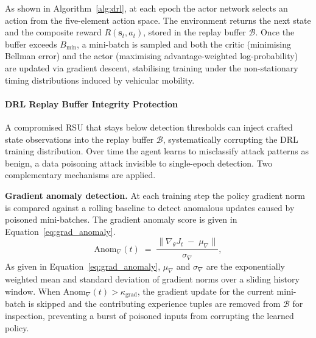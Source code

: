 As shown in Algorithm~\ref{alg:drl}, at each epoch the
actor network selects an action from the five-element
action space. The environment returns the next state and
the composite reward $R(\mathbf{s}_t, a_t)$, stored in
the replay buffer $\mathcal{B}$. Once the buffer exceeds
$B_{\min}$, a mini-batch is sampled and both the critic
(minimising Bellman error) and the actor (maximising
advantage-weighted log-probability) are updated via
gradient descent, stabilising training under the
non-stationary timing distributions induced by vehicular
mobility.



\paragraph{DRL Replay Buffer Integrity Protection}
\label{sec:drl_integrity}

A compromised RSU that stays below detection thresholds can inject
crafted state observations into the replay buffer $\mathcal{B}$,
systematically corrupting the DRL training distribution. Over time
the agent learns to misclassify attack patterns as benign, a data
poisoning attack invisible to single-epoch detection. Two
complementary mechanisms are applied.

\textbf{Gradient anomaly detection.}
At each training step the policy gradient norm is compared against
a rolling baseline to detect anomalous updates caused by poisoned
mini-batches. The gradient anomaly score is given in
Equation~\eqref{eq:grad_anomaly}.
%
\begin{equation}
  \mathrm{Anom}_{\nabla}(t) \;=\;
    \frac{
      \bigl\|\nabla_\theta J_t \;-\; \mu_{\nabla}\bigr\|
    }{
      \sigma_{\nabla}
    },
  \label{eq:grad_anomaly}
\end{equation}
%
As given in Equation~\eqref{eq:grad_anomaly}, $\mu_{\nabla}$
and $\sigma_{\nabla}$ are the exponentially weighted mean and
standard deviation of gradient norms over a sliding history
window. When $\mathrm{Anom}_{\nabla}(t) > \kappa_{\mathrm{grad}}$,
the gradient update for the current mini-batch is skipped and
the contributing experience tuples are removed from $\mathcal{B}$
for inspection, preventing a burst of poisoned inputs from
corrupting the learned policy.

